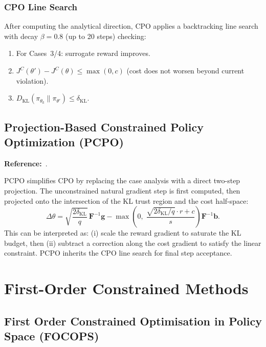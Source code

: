 \documentclass[12pt,a4paper]{article}
\theoremstyle{definition}
\newcommand{\piold}{\pi_{\theta_k}}
\newcommand{\KL}{D_{\mathrm{KL}}}
\newcommand{\Fmat}{\mathbf{F}}
\newcommand{\bvec}{\mathbf{b}}
\newcommand{\gvec}{\mathbf{g}}
\begin{document}
\subsubsection{CPO Line Search}

After computing the analytical direction, CPO applies a backtracking line search with
decay $\beta = 0.8$ (up to 20 steps) checking:
\begin{enumerate}[nosep]
  \item For Cases~3/4: surrogate reward improves.
  \item $J^C(\theta') - J^C(\theta) \leq \max(0, c)$ (cost does not worsen beyond current violation).
  \item $\KL(\piold\|\pi_{\theta'}) \leq \delta_{\mathrm{KL}}$.
\end{enumerate}

\subsection{Projection-Based Constrained Policy Optimization (PCPO)}
\label{sec:pcpo}

\textbf{Reference:}~\citet{yang2020projection}.

PCPO simplifies CPO by replacing the case analysis with a direct two-step projection.
The unconstrained natural gradient step is first computed, then projected onto the
intersection of the KL trust region and the cost half-space:
\begin{equation}
  \label{eq:pcpo_step}
  \Delta\theta = \sqrt{\frac{2\delta_{\mathrm{KL}}}{q}}\,\Fmat^{-1}\gvec
  - \max\!\!\left(0,\;\frac{\sqrt{2\delta_{\mathrm{KL}}/q}\cdot r + c}{s}\right)\Fmat^{-1}\bvec.
\end{equation}
This can be interpreted as: (i) scale the reward gradient to saturate the KL budget, then
(ii) subtract a correction along the cost gradient to satisfy the linear constraint. PCPO
inherits the CPO line search for final step acceptance.

\section{First-Order Constrained Methods}
\label{sec:firstorder}

\subsection{First Order Constrained Optimisation in Policy Space (FOCOPS)}
\label{sec:focops}
\end{document}
